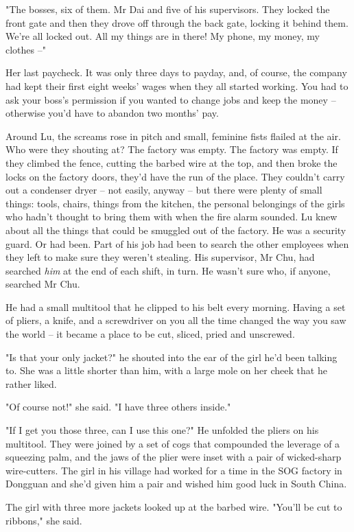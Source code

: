 "The bosses, six of them. Mr Dai and five of his supervisors. They
locked the front gate and then they drove off through the back
gate, locking it behind them. We're all locked out. All my things
are in there! My phone, my money, my clothes --"

Her last paycheck. It was only three days to payday, and, of
course, the company had kept their first eight weeks' wages when
they all started working. You had to ask your boss's permission if
you wanted to change jobs and keep the money -- otherwise you'd
have to abandon two months' pay.

Around Lu, the screams rose in pitch and small, feminine fists
flailed at the air. Who were they shouting at? The factory was
empty. The factory was empty. If they climbed the fence, cutting
the barbed wire at the top, and then broke the locks on the factory
doors, they'd have the run of the place. They couldn't carry out a
condenser dryer -- not easily, anyway -- but there were plenty of
small things: tools, chairs, things from the kitchen, the personal
belongings of the girls who hadn't thought to bring them with when
the fire alarm sounded. Lu knew about all the things that could be
smuggled out of the factory. He was a security guard. Or had been.
Part of his job had been to search the other employees when they
left to make sure they weren't stealing. His supervisor, Mr Chu,
had searched \emph{him} at the end of each shift, in turn. He
wasn't sure who, if anyone, searched Mr Chu.

He had a small multitool that he clipped to his belt every morning.
Having a set of pliers, a knife, and a screwdriver on you all the
time changed the way you saw the world -- it became a place to be
cut, sliced, pried and unscrewed.

"Is that your only jacket?" he shouted into the ear of the girl
he'd been talking to. She was a little shorter than him, with a
large mole on her cheek that he rather liked.

"Of course not!" she said. "I have three others inside."

"If I get you those three, can I use this one?" He unfolded the
pliers on his multitool. They were joined by a set of cogs that
compounded the leverage of a squeezing palm, and the jaws of the
plier were inset with a pair of wicked-sharp wire-cutters. The girl
in his village had worked for a time in the SOG factory in Dongguan
and she'd given him a pair and wished him good luck in South
China.

The girl with three more jackets looked up at the barbed wire.
"You'll be cut to ribbons," she said.

